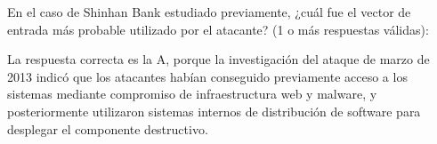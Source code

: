 \begin{mcq}{En el caso de Shinhan Bank estudiado previamente, ¿cuál fue el vector de
entrada más probable utilizado por el atacante? (1 o más respuestas válidas):}
\end{mcq}
\begin{respuesta}
La respuesta correcta es la A, porque la investigación del ataque de marzo de 2013 indicó que los atacantes habían conseguido previamente acceso a los sistemas mediante compromiso de infraestructura web y malware, y posteriormente utilizaron sistemas internos de distribución de software para desplegar el componente destructivo. 
\end{respuesta}
